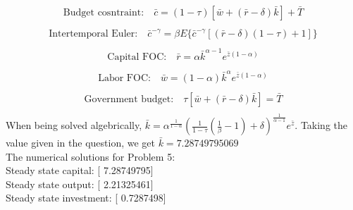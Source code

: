 \documentclass[letterpaper,12pt]{article}
\theoremstyle{definition}
\begin{document}
\begin{enumerate}
\begin{equation}
\begin{split}
	\text{Budget cosntraint:} \quad \bar{c} = (1 - \tau)[\bar{w} + (\bar{r} - \delta)\bar{k}] + \bar{T}\\
	\end{split}
	\end{equation}
	\begin{equation} \label{eq2}
	\begin{split}
	\text{Intertemporal Euler:} \quad \bar{c}^{-\gamma} = \beta E\{  \bar{c}^{-\gamma}[(\bar{r} - \delta)(1 - \tau) + 1]\} \\
	\end{split}
	\end{equation}
	\begin{equation} \label{eq3}
	\begin{split}
	\text{Capital FOC:} \quad \bar{r} = \alpha \bar{k}^{\alpha - 1} e^{\bar{z}(1 - \alpha)} \\
	\end{split}
	\end{equation}
	\begin{equation} \label{eq4}
	\begin{split}
	\text{Labor FOC:} \quad \bar{w} = (1 - \alpha)\bar{k}^{\alpha} e^{\bar{z}(1 - \alpha)} \\
	\end{split}
	\end{equation}
	\begin{equation} \label{eq5}
	\begin{split}
	\text{Government budget:} \quad \tau[\bar{w} + (\bar{r} - \delta)\bar{k}] = \bar{T}  \\
	\end{split}
	\end{equation}
	When being solved algebrically, $\bar{k} =\alpha^{\frac{1}{1 - \alpha}}(\frac{1}{1 - \tau}(\frac{1}{\beta} - 1) + \delta)^{\frac{1}{\alpha - 1}} e^{\bar{z}}$. Taking the value given in the question, we get $\bar{k} =7.28749795069$\\
	The numerical solutions for Problem 5: \\
	Steady state capital:  [ 7.28749795]\\
	Steady state output:  [ 2.21325461]\\
	Steady state investment:  [ 0.7287498] \\
	



\end{enumerate}
\end{document}
